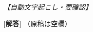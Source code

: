 \documentclass[../../main.tex]{subfiles}
\begin{document}
\begin{oframed}
  
\end{oframed}

\begin{flushright}
  \footnotesize\textit{【自動文字起こし・要確認】}
\end{flushright}

{\bf [解答]}
（原稿は空欄）
\end{document}
